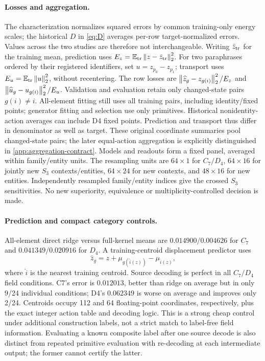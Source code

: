 \paragraph{Losses and aggregation.}
The characterization normalizes squared errors by common training-only energy scales; the historical $D$ in \cref{eq:D} averages per-row target-normalized errors. Values across the two studies are therefore not interchangeable. Writing $\bar z_{\rm tr}$ for the training mean, prediction uses $E_z=\mathbb{E}_{\rm tr}\left\lVert z-\bar z_{\rm tr}\right\rVert_2^2$. For two paraphrases ordered by their registered identifiers, set $u=z_{p_0}-z_{p_1}$; transport uses $E_u=\mathbb{E}_{\rm tr}\left\lVert u\right\rVert_2^2$, without recentering. The row losses are $\left\lVert \widehat z_g-z_{g(i)}\right\rVert_2^2/E_z$ and $\left\lVert \widehat u_g-u_{g(i)}\right\rVert_2^2/E_u$. Validation and evaluation retain only changed-state pairs $g(i)\ne i$. All-element fitting still uses all training pairs, including identity/fixed points; generator fitting and selection use only primitives. Historical nonidentity-action averages can include D4 fixed points. Prediction and transport thus differ in denominator as well as target. These original coordinate summaries pool changed-state pairs; the later equal-action aggregation is explicitly distinguished in \cref{app:aggregation-contract}. Models and readouts form a fixed panel, averaged within family/entity units. The resampling units are $64\times1$ for $C_7/D_4$, $64\times16$ for jointly new $S_3$ contexts/entities, $64\times24$ for new contexts, and $48\times16$ for new entities. Independently resampled family/entity indices give the crossed $S_3$ sensitivities. No new superiority, equivalence or multiplicity-controlled decision is made.


\paragraph{Prediction and compact category controls.}
All-element direct ridge versus full-kernel means are $0.014900/0.004626$ for $C_7$ and $0.041349/0.020916$ for $D_4$. A training-centroid displacement predictor uses
\[
 \widehat z_g=z+\mu_{g(\widehat i(z))}-\mu_{\widehat i(z)},
\]
where $\widehat i$ is the nearest training centroid. Source decoding is perfect in all $C_7/D_4$ field conditions. C7's error is $0.012013$, better than ridge on average but in only 9/24 individual conditions; D4's $0.062349$ is worse on average and improves only 2/24. Centroids occupy 112 and 64 floating-point coordinates, respectively, plus the exact integer action table and decoding logic. This is a strong cheap control under additional construction labels, not a strict match to label-free field information. Evaluating a known composite label after one source decode is also distinct from repeated primitive evaluation with re-decoding at each intermediate output; the former cannot certify the latter.

